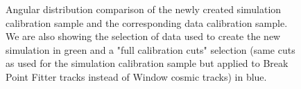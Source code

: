 \documentclass[12pt]{article}
\begin{document}
\begin{figure}[!ht]

\caption{Angular distribution comparison of the newly created simulation calibration sample and the corresponding data calibration sample. We are also showing the selection of data used to create the new simulation in green and a "full calibration cuts" selection (same cuts as used for the simulation calibration sample but applied to Break Point Fitter tracks instead of Window cosmic tracks) in blue.}
\label{figDataMCComparison_cosXcosY}
\end{figure}
\end{document}
